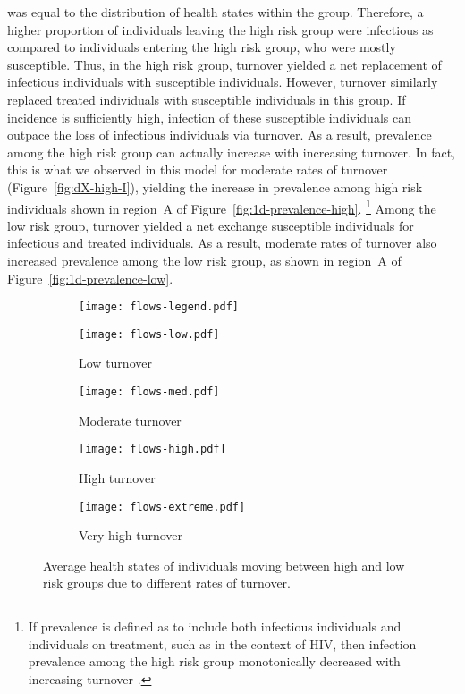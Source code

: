 was equal to the distribution of health states within the group.
Therefore, a higher proportion of individuals leaving the high risk group
were infectious as compared to individuals entering the high risk group,
who were mostly susceptible.
Thus, in the high risk group,
turnover yielded a net replacement of infectious individuals with susceptible individuals.
However, turnover similarly replaced treated individuals
with susceptible individuals in this group.
If incidence is sufficiently high,
infection of these susceptible individuals can
outpace the loss of infectious individuals via turnover.
As a result, prevalence among the high risk group
can actually increase with increasing turnover.
In fact, this is what we observed in this model for moderate rates of turnover
(Figure~\ref{fig:dX-high-I}),
yielding the increase in prevalence among high risk individuals
shown in region~A of Figure~\ref{fig:1d-prevalence-high}.%
\footnote{If prevalence is defined as to include
  both infectious individuals and individuals on treatment,
  such as in the context of HIV,
  then infection prevalence among the high risk group
  monotonically decreased with increasing turnover \citep{Knight2019}.}
Among the low risk group, turnover yielded a net exchange susceptible individuals
for infectious and treated individuals.
As a result, moderate rates of turnover also
increased prevalence among the low risk group,
as shown in region~A of Figure~\ref{fig:1d-prevalence-low}.
\par
\begin{figure}[!tbp]
  \centering
  \begin{subfigure}[t]{0.6\linewidth}
    \centering
    \texttt{[image: flows-legend.pdf]}
  \end{subfigure}
  \begin{subfigure}[t]{0.2\linewidth}
    \centering
    \texttt{[image: flows-low.pdf]}
    \caption{Low turnover}
    \label{fig:flows-low}
  \end{subfigure}%
  \begin{subfigure}[t]{0.2\linewidth}
    \centering
    \texttt{[image: flows-med.pdf]}
    \caption{Moderate turnover}
    \label{fig:flows-med}
  \end{subfigure}%
  \begin{subfigure}[t]{0.2\linewidth}
    \centering
    \texttt{[image: flows-high.pdf]}
    \caption{High turnover}
    \label{fig:flows-high}
  \end{subfigure}%
  \begin{subfigure}[t]{0.2\linewidth}
    \centering
    \texttt{[image: flows-extreme.pdf]}
    \caption{Very high turnover}
    \label{fig:flows-extreme}
  \end{subfigure}
  \caption{Average health states of individuals
    moving between high and low risk groups due to different rates of turnover.}
  \label{fig:flows}
\end{figure}
